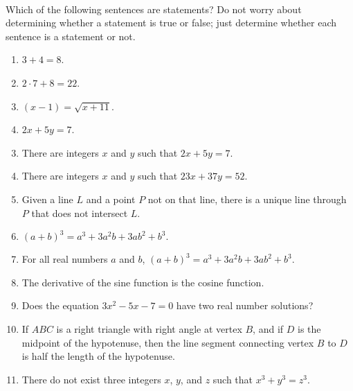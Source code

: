 \begin{prog} \label{prog:statements2} \hfill \\
Which of the following sentences are statements?  Do not worry about determining whether a statement is true or false; just determine whether each sentence is a statement or not.

\begin{multicols}{2}
\begin{enumerate}
\item $3 + 4 = 8$.

\item $2 \cdot 7 + 8 = 22$.

\item	$\left( {x - 1} \right) = \sqrt {x + 11}$.

\item $2x + 5y = 7$.\label{PA:prop3}
\end{enumerate}
\end{multicols}
\begin{enumerate} \setcounter{enumi}{2}
\item There are integers  $x$  and  $y$  such that $2x + 5y = 7.$\label{PA:prop4}

\item There are integers  $x$  and  $y$  such that $23x + 37y = 52.$


\item Given a line  $L$  and a point  $P$  not on that line, there is a unique line through  $P$  that does not intersect  $L$.

\item $\left( {a + b} \right)^3  = a^3 + 3a^2b + 3ab^2  + b^3.$\label{PA:prop8}

\item For all real numbers $a$ and $b$, $\left( {a + b} \right)^3  = a^3  + 3a^2b + 3ab^2 + b^3$.
\label{PA:prop9}

\item The derivative of the sine function is the cosine function.  %

\item Does the equation $3x^2 - 5x - 7 = 0$ have two real number solutions?

\item If $ABC$ is a right triangle with right angle at vertex $B$, and if $D$ is the midpoint of the hypotenuse, then the line segment connecting vertex $B$ to $D$ is half the length of the hypotenuse.


\item There do not exist three integers  $x$, $y$, and  $z$ such that 
 $x^3  + y^3  = z^3.$
\end{enumerate}
\end{prog}
\hbreak

\endinput
